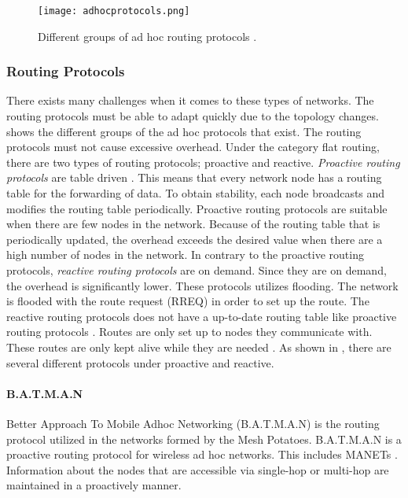 \begin{figure}[h!]
  \centering
    \texttt{[image: adhocprotocols.png]}
     \caption{Different groups of ad hoc routing protocols \cite{adhoc}.}
\label{fig:adhocprotocols}
\end{figure}


\subsubsection{Routing Protocols}
There exists many challenges when it comes to these types of networks. The routing protocols must be able to adapt quickly due to the topology changes.  shows the different groups of the ad hoc protocols that exist. The routing protocols must not cause excessive overhead. Under the category flat routing, there are two types of routing protocols; proactive and reactive. \textit{Proactive routing protocols} are table driven \citep{proactivereactive}. This means that every network node has a routing table for the forwarding of data. To obtain stability, each node broadcasts and modifies the routing table periodically. Proactive routing protocols are suitable when there are few nodes in the network. Because of the routing table that is periodically updated, the overhead exceeds the desired value when there are a high number of nodes in the network. In contrary to the proactive routing protocols, \textit{reactive routing protocols} are on demand. Since they are on demand, the overhead is significantly lower. These protocols utilizes flooding. The network is flooded with the route request (RREQ) in order to set up the route. The reactive routing protocols does not have a up-to-date routing table like proactive routing protocols \cite{proactivereactive}. Routes are only set up to nodes they communicate with. These routes are only kept alive while they are needed  \cite{adhoc2}. As shown in , there are several different protocols under proactive and reactive. 

\paragraph{B.A.T.M.A.N}
Better Approach To Mobile Adhoc Networking (B.A.T.M.A.N) is the routing protocol utilized in the networks formed by the Mesh Potatoes. B.A.T.M.A.N is a proactive routing protocol for wireless ad hoc networks. This includes MANETs \cite{batman}. Information about the nodes that are accessible via single-hop or multi-hop are maintained in a proactively manner. 


